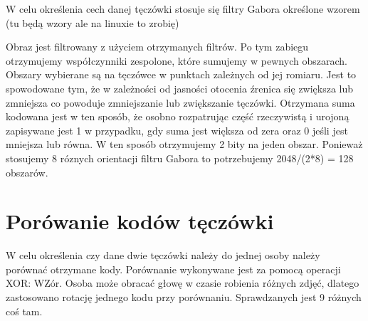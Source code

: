 W celu określenia cech danej tęczówki stosuje się filtry Gabora określone wzorem (tu będą wzory ale na linuxie to zrobię)

Obraz jest filtrowany z użyciem otrzymanych filtrów. Po tym zabiegu otrzymujemy współczynniki zespolone, które sumujemy w pewnych obszarach. Obszary wybierane są na tęczówce w punktach zależnych od jej romiaru. Jest to spowodowane tym, że w zależności od jasności otocenia źrenica się zwiększa lub zmniejsza co powoduje zmniejszanie lub zwiększanie tęczówki. Otrzymana suma kodowana jest w ten sposób, że osobno rozpatrując część rzeczywistą i urojoną zapisywane jest 1 w przypadku, gdy suma jest większa od zera oraz 0 jeśli jest mniejsza lub równa. W ten sposób otrzymujemy 2 bity na jeden obszar. Ponieważ stosujemy 8 róznych orientacji filtru Gabora to potrzebujemy 2048/(2*8) = 128 obszarów. 

\section{Porówanie kodów tęczówki}
\label{sec:porownanieKodow}
W celu określenia czy dane dwie tęczówki należy do jednej osoby należy porównać otrzymane kody. Porównanie wykonywane jest za pomocą operacji XOR: WZór. Osoba może obracać głowę w czasie robienia różnych zdjęć, dlatego zastosowano rotację jednego kodu przy porównaniu. Sprawdzanych jest 9 różnych coś tam.